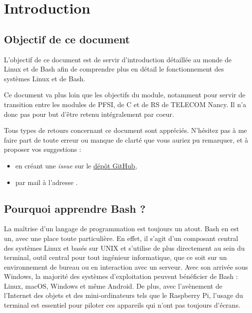 \section*{Introduction}

\subsection*{Objectif de ce document}
L'objectif de ce document est de servir d'introduction détaillée au monde de Linux et de Bash afin de comprendre plus en détail le fonctionnement des systèmes Linux et de Bash.

Ce document va plus loin que les objectifs du module, notamment pour servir de transition entre les modules de PFSI, de C et de RS de TELECOM Nancy. Il n'a donc pas pour but d'être retenu intégralement par coeur.

 Tous types de retours concernant ce document sont appréciés. N'hésitez pas à me faire part de toute erreur ou manque de clarté que vous auriez pu remarquer, et à proposer vos suggestions :
\begin{itemize}
    \item en créant une \textit{issue} sur le \href{https://github.com/bsegault/shell}{dépôt GitHub},
    \item par mail à l'adresse .
\end{itemize}

\subsection*{Pourquoi apprendre Bash ?}

La maîtrise d'un langage de programmation est toujours un atout. Bash en est un, avec une place toute particulière. En effet, il s'agit d'un composant central des systèmes Linux et basés sur UNIX et s'utilise de plus directement au sein du terminal, outil central pour tout ingénieur informatique, que ce soit sur un environnement de bureau ou en interaction avec un serveur. \newline
Avec son arrivée sous Windows, la majorité des systèmes d'exploitation peuvent bénéficier de Bash : Linux, macOS, Windows et même Android. De plus, avec l'avènement de l'Internet des objets et des mini-ordinateurs tels que le Raspberry Pi, l'usage du terminal est essentiel pour piloter ces appareils qui n'ont pas toujours d'écrans.

